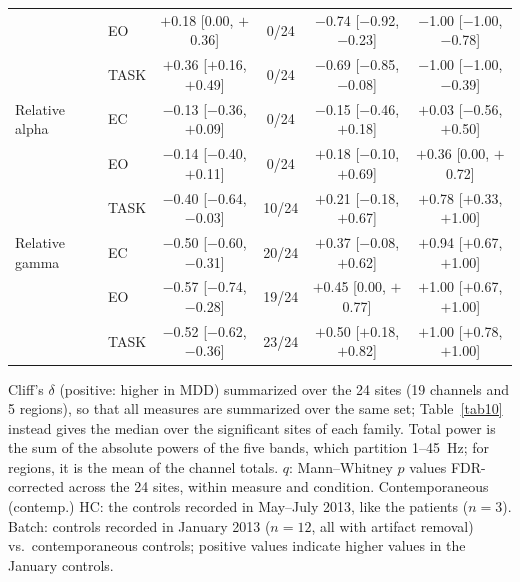 \begin{table}[!t]
\begin{tabular}{llcccc}
 & EO & $+$0.18 [0.00, $+$0.36] & 0/24 & $-$0.74 [$-$0.92, $-$0.23] & $-$1.00 [$-$1.00, $-$0.78] \\
 & TASK & $+$0.36 [$+$0.16, $+$0.49] & 0/24 & $-$0.69 [$-$0.85, $-$0.08] & $-$1.00 [$-$1.00, $-$0.39] \\
\addlinespace
Relative alpha & EC & $-$0.13 [$-$0.36, $+$0.09] & 0/24 & $-$0.15 [$-$0.46, $+$0.18] & $+$0.03 [$-$0.56, $+$0.50] \\
 & EO & $-$0.14 [$-$0.40, $+$0.11] & 0/24 & $+$0.18 [$-$0.10, $+$0.69] & $+$0.36 [0.00, $+$0.72] \\
 & TASK & $-$0.40 [$-$0.64, $-$0.03] & 10/24 & $+$0.21 [$-$0.18, $+$0.67] & $+$0.78 [$+$0.33, $+$1.00] \\
\addlinespace
Relative gamma & EC & $-$0.50 [$-$0.60, $-$0.31] & 20/24 & $+$0.37 [$-$0.08, $+$0.62] & $+$0.94 [$+$0.67, $+$1.00] \\
 & EO & $-$0.57 [$-$0.74, $-$0.28] & 19/24 & $+$0.45 [0.00, $+$0.77] & $+$1.00 [$+$0.67, $+$1.00] \\
 & TASK & $-$0.52 [$-$0.62, $-$0.36] & 23/24 & $+$0.50 [$+$0.18, $+$0.82] & $+$1.00 [$+$0.78, $+$1.00] \\
\bottomrule
\end{tabular}
\par\vspace{2pt}
\begin{minipage}{\textwidth}
\scriptsize
Cliff's $\delta$ (positive: higher in MDD) summarized over the 24 sites (19 channels and 5 regions), so that all measures are summarized over the same set; Table~\ref{tab10} instead gives the median over the significant sites of each family. Total power is the sum of the absolute powers of the five bands, which partition 1--45~Hz; for regions, it is the mean of the channel totals. $q$: Mann--Whitney $p$ values FDR-corrected across the 24 sites, within measure and condition. Contemporaneous (contemp.) HC: the controls recorded in May--July 2013, like the patients ($n = 3$). Batch: controls recorded in January 2013 ($n = 12$, all with artifact removal) vs.\ contemporaneous controls; positive values indicate higher values in the January controls.
\end{minipage}
\end{table}